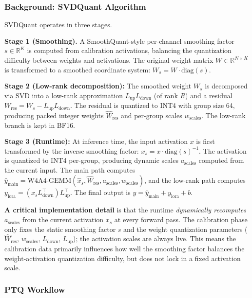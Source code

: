 \documentclass[10pt]{article}
\begin{document}
\subsubsection{Background: SVDQuant Algorithm}

SVDQuant operates in three stages.

\textbf{Stage 1 (Smoothing).} A SmoothQuant-style per-channel smoothing factor $s \in \mathbb{R}^{K}$ is computed from calibration activations, balancing the quantization difficulty between weights and activations. The original weight matrix $W \in \mathbb{R}^{N \times K}$ is transformed to a smoothed coordinate system: $W_s = W \cdot \mathrm{diag}(s)$.

\textbf{Stage 2 (Low-rank decomposition):} The smoothed weight $W_s$ is decomposed via SVD into a low-rank approximation $L_{\text{up}} L_{\text{down}}$ (of rank $R$) and a residual $W_{\text{res}} = W_s - L_{\text{up}} L_{\text{down}}$. The residual is quantized to INT4 with group size 64, producing packed integer weights $\hat{W}_{\text{res}}$ and per-group scales $w_{\text{scales}}$. The low-rank branch is kept in BF16.

\textbf{Stage 3 (Runtime):} At inference time, the input activation $x$ is first transformed by the inverse smoothing factor: $x_s = x \cdot \mathrm{diag}(s)^{-1}$. The activation is quantized to INT4 per-group, producing dynamic scales $a_{\text{scales}}$ computed from the current input. The main path computes $\hat{y}_{\text{main}} = \text{W4A4-GEMM}(\hat{x}_s, \hat{W}_{\text{res}}, a_{\text{scales}}, w_{\text{scales}})$, and the low-rank path computes $y_{\text{lora}} = (x_s L_{\text{down}}^\top) L_{\text{up}}^\top$. The final output is $y = \hat{y}_{\text{main}} + y_{\text{lora}} + b$.

\textbf{A critical implementation detail} is that the runtime \textit{dynamically recomputes} $a_{\text{scales}}$ from the current activation $x_s$ at every forward pass. The calibration phase only fixes the static smoothing factor $s$ and the weight quantization parameters ($\hat{W}_{\text{res}}$, $w_{\text{scales}}$, $L_{\text{down}}$, $L_{\text{up}}$); the activation scales are always live. This means the calibration data primarily influences how well the smoothing factor balances the weight-activation quantization difficulty, but does not lock in a fixed activation scale.

\subsubsection{PTQ Workflow}
\end{document}
